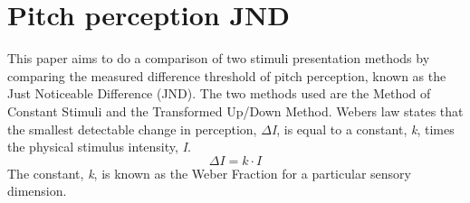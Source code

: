 \chapter*{Pitch perception JND}
This paper aims to do a comparison of two stimuli presentation methods by comparing the measured difference threshold of pitch perception, known as the Just Noticeable Difference (JND). The two methods used are the Method of Constant Stimuli and the Transformed Up/Down Method. Webers law states that the smallest detectable change in perception, $\Delta$\textit{I}, is equal to a constant, \textit{k}, times the physical stimulus intensity, \textit{I}.
%
\begin{equation}
\Delta I= k \cdot I
\end{equation}
%
The constant, \textit{k}, is known as the Weber Fraction for a particular sensory dimension.




